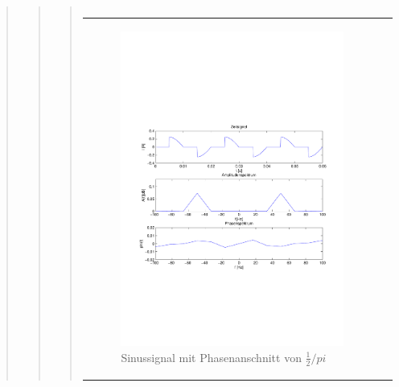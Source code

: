 \begin{quote}
\begin{quote}
\begin{quote}
\begin{center}
\begin{tabular}{ll}
                \end{tabular}
                \end{center}
    
                \begin{center}
                \begin{tabular}{ll}
    
                \hspace{-11em}
                    \begin{minipage}{0.6\textwidth}
    
                        \begin{figure}[H]
                            \label{fig:}
                            \includegraphics[scale=0.5, trim = 2cm 7cm 1.5cm 8.5cm, clip]{./Bilder/Phasenanschnitt48pi.pdf} %
                            \caption{Sinussignal mit Phasenanschnitt von $\frac{1}{2}/pi$}
                        \end{figure}
    

\end{minipage}
\end{tabular}
\end{center}
\end{quote}
\end{quote}
\end{quote}
